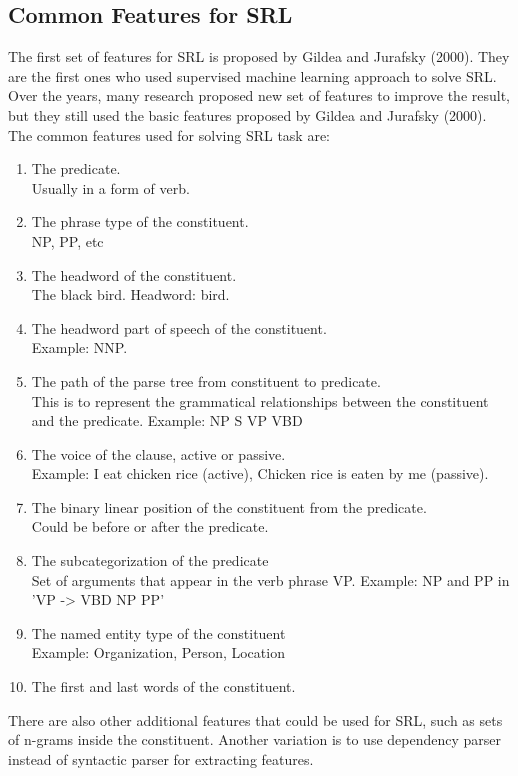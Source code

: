\subsection{Common Features for SRL}
The first set of features for SRL is proposed by Gildea and Jurafsky (2000). They are the first ones who used supervised machine learning approach to solve SRL. Over the years, many research proposed new set of features to improve the result, but they still used the basic features proposed by Gildea and Jurafsky (2000). The common features used for solving SRL task are:
\begin{enumerate}
	\item The predicate.\\
	Usually in a form of verb.
	\item The phrase type of the constituent.\\
	NP, PP, etc
	\item The headword of the constituent.\\
	The black bird. Headword: bird.
	\item The headword part of speech of the constituent. \\
	Example: NNP.
	\item The path of the parse tree from constituent to predicate. \\
	This is to represent the grammatical relationships between the constituent and the predicate.
	Example: NP S VP VBD
	\item The voice of the clause, active or passive.\\
	Example: I eat chicken rice (active), Chicken rice is eaten by me (passive).
	\item The binary linear position of the constituent from the predicate.\\
	Could be before or after the predicate.
	\item The subcategorization of the predicate\\
	Set of arguments that appear in the verb phrase VP.
	Example: NP and PP in 'VP -> VBD NP PP'
	\item The named entity type of the constituent\\
	Example: Organization, Person, Location
	\item The first and last words of the constituent.
\end{enumerate}

There are also other additional features that could be used for SRL, such as sets of n-grams inside the constituent. Another variation is to use dependency parser instead of syntactic parser for extracting features.

